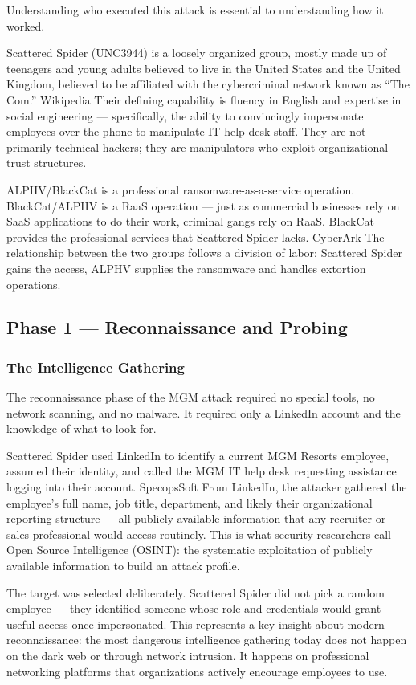 Understanding who executed this attack is essential to understanding how it worked.

Scattered Spider (UNC3944) is a loosely organized group, mostly made up of teenagers and young adults believed to live in the United States and the United Kingdom, believed to be affiliated with the cybercriminal network known as ``The Com.'' Wikipedia Their defining capability is fluency in English and expertise in social engineering — specifically, the ability to convincingly impersonate employees over the phone to manipulate IT help desk staff. They are not primarily technical hackers; they are manipulators who exploit organizational trust structures.

ALPHV/BlackCat is a professional ransomware-as-a-service operation. BlackCat/ALPHV is a RaaS operation — just as commercial businesses rely on SaaS applications to do their work, criminal gangs rely on RaaS. BlackCat provides the professional services that Scattered Spider lacks. CyberArk The relationship between the two groups follows a division of labor: Scattered Spider gains the access, ALPHV supplies the ransomware and handles extortion operations.

\subsection{Phase 1 — Reconnaissance and Probing}

\subsubsection{The Intelligence Gathering}

The reconnaissance phase of the MGM attack required no special tools, no network scanning, and no malware. It required only a LinkedIn account and the knowledge of what to look for.

Scattered Spider used LinkedIn to identify a current MGM Resorts employee, assumed their identity, and called the MGM IT help desk requesting assistance logging into their account. SpecopsSoft From LinkedIn, the attacker gathered the employee's full name, job title, department, and likely their organizational reporting structure — all publicly available information that any recruiter or sales professional would access routinely. This is what security researchers call Open Source Intelligence (OSINT): the systematic exploitation of publicly available information to build an attack profile.

The target was selected deliberately. Scattered Spider did not pick a random employee — they identified someone whose role and credentials would grant useful access once impersonated. This represents a key insight about modern reconnaissance: the most dangerous intelligence gathering today does not happen on the dark web or through network intrusion. It happens on professional networking platforms that organizations actively encourage employees to use.

